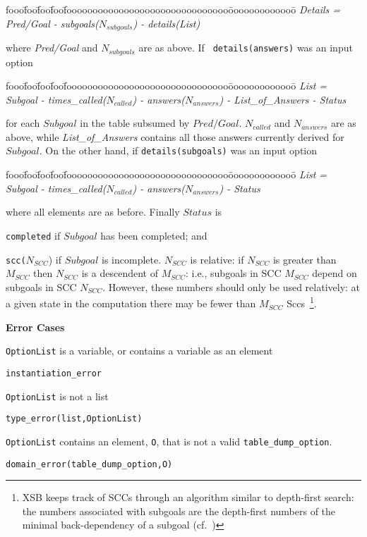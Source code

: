 \begin{description}
\begin{tabbing}
fooo\=foo\=foo\=foo\=fooooooooooooooooooooooooooooooo\=ooooooooooooo\=\kill
%
{\em   Details = } \\
\> {\em Pred/Goal  - subgoals($N_{subgoals}$) - details(List)}
%
\end{tabbing}
%
where {\em Pred/Goal} and $N_{subgoals}$ are as above.  If {\tt
  details(answers)} was an input option
%
\begin{tabbing}
fooo\=foo\=foo\=foo\=fooooooooooooooooooooooooooooooo\=ooooooooooooo\=\kill
%
{\em List = }\\
\>  {\em Subgoal - times\_called($N_{called}$) - answers($N_{answers}$) - List\_of\_Answers - Status}
%
\end{tabbing}
%
for each $Subgoal$ in the table subsumed by $Pred/Goal$.  $N_{called}$
and $N_{answers}$ are as above, while {\em List\_of\_Answers} contains
all those answers currently derived for $Subgoal$.  On the other hand,
if {\tt details(subgoals)} was an input option 
\begin{tabbing}
fooo\=foo\=foo\=foo\=fooooooooooooooooooooooooooooooo\=ooooooooooooo\=\kill
%
{\em List = }\\
\>  {\em Subgoal - times\_called($N_{called}$) - answers($N_{answers}$) - Status}
%
\end{tabbing}
%
where all elements are as before.  Finally $Status$ is
%
\bi
\item {\tt completed} if $Subgoal$ has been completed; and
%
\item {\tt scc($N_{SCC}$}) if $Subgoal$ is incomplete.  $N_{SCC}$ is
  relative: if $N_{SCC}$ is greater than $M_{SCC}$ then $N_{SCC}$ is a
  descendent of $M_{SCC}$: i.e., subgoals in SCC $M_{SCC}$ depend on
  subgoals in SCC $N_{SCC}$.  However, these numbers should only be
  used relatively: at a given state in the computation there may be
  fewer than $M_{SCC}$ Sccs~\footnote{XSB keeps track of SCCs through
    an algorithm similar to depth-first search: the numbers associated
    with subgoals are the depth-first numbers of the minimal
    back-dependency of a subgoal (cf.~\cite{SaSw98})}.
\ei


{\bf Error Cases}
\bi
\item {\tt OptionList} is a variable, or contains a variable as an element
\bi
\item {\tt instantiation\_error}
\ei
\item {\tt OptionList} is not a list
\bi
\item {\tt type\_error(list,OptionList)}
\ei
\item {\tt OptionList} contains an element, {\tt O}, that is not a
  valid {\tt table\_dump\_option}.
\bi
\item {\tt domain\_error(table\_dump\_option,O)}
\ei
\ei


\end{description}

